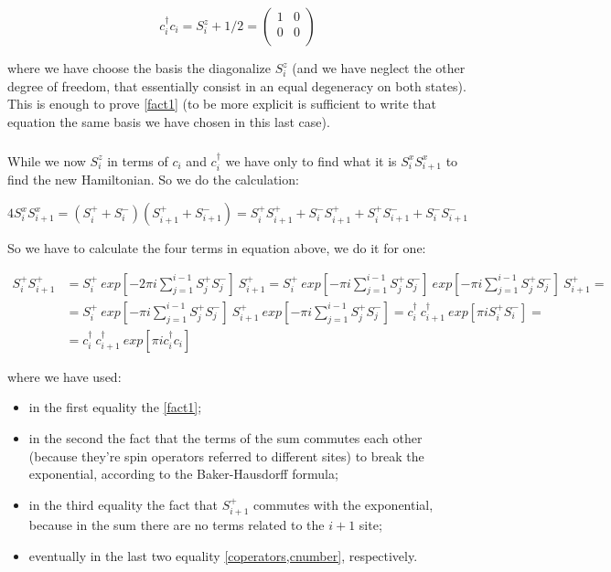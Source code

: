 \documentclass[a4paper,10pt]{article}
\begin{document}
\begin{equation}
c_i^\dagger c_i = S_i^z + 1/2 = \begin{pmatrix}
1 & 0\\
0 & 0\\
\end{pmatrix}
\label{numinabasis}
\end{equation}

\noindent where we have choose the basis the diagonalize $S_i^z$ (and we have neglect the other degree of freedom, that essentially consist in an equal degeneracy on both states). This is enough to prove \cref{fact1} (to be more explicit is sufficient to write that equation the same basis we have chosen in this last case).

\subparagraph{}While we now $S_i^z$ in terms of $c_i$ and $c_i^\dagger$ we have only to find what it is $S_i^x S_{i+1}^x$ to find the new Hamiltonian. So we do the calculation:

\begin{equation*}
4 S_i^x S_{i+1}^x = (S_i^+ + S_i^-)(S_{i+1}^+ + S_{i+1}^-) = S_i^+ S_{i+1}^+ + S_i^- S_{i+1}^+ + S_i^+ S_{i+1}^- + S_i^- S_{i+1}^-
\end{equation*}

So we have to calculate the four terms in equation above, we do it for one:

\begin{align*}
S_i^+ S_{i+1}^+ &= S_i^+~exp[- 2\pi i  \sum_{j=1}^{i-1} S_j^+ S_j^-]~S_{i+1}^+ = S_i^+ ~exp[- \pi i  \sum_{j=1}^{i-1} S_j^+ S_j^-]~exp[- \pi i  \sum_{j=1}^{i-1} S_j^+ S_j^-]~ S_{i+1}^+ =\\
&= S_i^+~exp[- \pi i  \sum_{j=1}^{i-1} S_j^+ S_j^-]~S_{i+1}^+~exp[- \pi i  \sum_{j=1}^{i-1} S_j^+ S_j^-] = c_i^\dagger~c_{i+1}^\dagger~exp[\pi i S_i^+ S_i^-] =\\
&= c_i^\dagger~c_{i+1}^\dagger~exp[\pi i c_i^\dagger c_i]
\end{align*}

\noindent where we have used:
\begin{itemize}
	\item in the first equality the \cref{fact1};
	\item in the second the fact that the terms of the sum commutes each other (because they're spin operators referred to different sites) to break the exponential, according to the Baker-Hausdorff formula;
	\item in the third equality the fact that $S_{i+1}^+$ commutes with the exponential, because in the sum there are no terms related to the $i+1$ site;
	\item eventually in the last two equality \cref{coperators,cnumber}, respectively.
\end{itemize}
\end{document}
